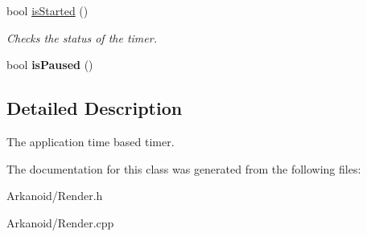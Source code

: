 \begin{DoxyCompactItemize}
\mbox{\label{class_l_timer_a102ca688eaa4109dd733b4b60a29d27c}} 
bool \hyperlink{class_l_timer_a102ca688eaa4109dd733b4b60a29d27c}{is\+Started} ()
\begin{DoxyCompactList}\small\item\em Checks the status of the timer. \end{DoxyCompactList}\item 
\mbox{\label{class_l_timer_ae1d9b504da6ed0f42e10f2338a9f88bb}} 
bool {\bfseries is\+Paused} ()
\end{DoxyCompactItemize}


\subsection{Detailed Description}
The application time based timer. 

The documentation for this class was generated from the following files\+:\begin{DoxyCompactItemize}
\item 
Arkanoid/Render.\+h\item 
Arkanoid/Render.\+cpp\end{DoxyCompactItemize}
